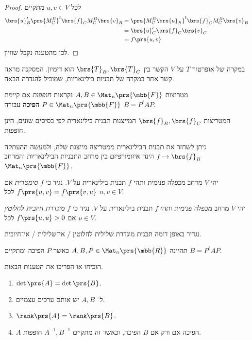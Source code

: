 \documentclass[a4paper,10pt,twoside,openany]{book}
\begin{document}
\begin{proof}
לכל
$u,v \in V$
מתקיים
\begin{align*}
\brs{u}_B^t \prs{M^B_C}^t \brs{f}_C M^B_C \brs{v}_B &=
\prs{M^B_C \brs{u}_B}^t \brs{f}_C M^B_C \brs{v}_B
\\&= \brs{u}_C^t \brs{f}_C \brs{v}_C
\\&= f\prs{u,v}
\end{align*}
לכן מהטענה נקבל שוויון.
\end{proof}

במקרה של אופרטור
$T$
על
$V$
הקשר בין
$\brs{T}_B, \brs{T}_C$
הוא דימיון. המסקנה מראה קשר אחר במקרה של תבניות בילינאריות, שמוביל להגדרה הבאה.

\begin{definition}
מטריצות
$A,B \in \Mat_n\prs{\mbb{F}}$
נקראות
\emph{חופפות}
אם קיימת
$P \in \Mat_n\prs{\mbb{F}}$
\textbf{הפיכה}
עבורה
$B = P^t A P$.
\end{definition}

\begin{corollary}
המטריצות
$\brs{f}_B, \brs{f}_C$
המייצגות תבנית בילינארית לפי בסיסים שונים, הינן חופפות.
\end{corollary}

\begin{remark}
ניתן לשחזר את תבנית הבילינארית ממטריצה מייצגת שלה, ולמעשה ההעתקה
$f \mapsto \brs{f}_B$
הינה איזומורפיזם בין מרחב התבניות הבילינאריות והמרחב
$\Mat_n\prs{\mbb{F}}$.
\end{remark}

\begin{definition}
יהי
$V$
מרחב מכפלה פנימית ותהי
$f$
תבנית בילינארית על
$V$.
נגיד כי
$f$
\emph{סימטרית}
אם
$f\prs{u,v} = f\prs{v,u}$
לכל
$u,v \in V$.
\end{definition}

\begin{definition}
יהי
$V$
מרחב מכפלה פנימית ותהי
$f$
תבנית בילינארית על
$V$.
נגיד כי
$f$
\emph{מוגדרת חיובית לחלוטין}
אם
$f\prs{u,u} > 0$
לכל
$u \in V$.

נגדיר באופן דומה תבנית מוגדרת שלילית לחלוטין%
\slash%
אי־שלילית%
\slash%
אי־חיובית.
\end{definition}

\begin{exercisechap}
תהיינה
$A,B,P \in \Mat_n\prs{\mbb{R}}$
כאשר
$P$
הפיכה ומתקיים
$B = P^t A P$.

הוכיחו או הפריכו את הטענות הבאות.
\begin{enumerate}
\item $\det\prs{A} = \det\prs{B}$.
\item ל־%
$A,B$
יש אותם ערכים עצמיים.
\item $\rank\prs{A} = \rank\prs{B}$.
\item $A$
הפיכה אם ורק אם
$B$
הפיכה, וכאשר זה מתקיים
$A^{-1}, B^{-1}$
חופפות.
\end{enumerate}
\end{exercisechap}
\end{document}
